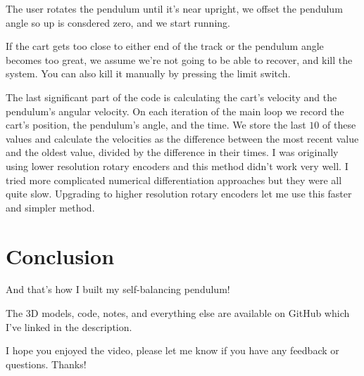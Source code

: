 \documentclass{article}
\begin{document}
The user rotates the pendulum until it's near upright, we offset the pendulum angle so up is consdered zero, and we start running.

If the cart gets too close to either end of the track or the pendulum angle becomes too great, we assume we're not going to be able to recover, and kill the system. You can also kill it manually by pressing the limit switch.

The last significant part of the code is calculating the cart's velocity and the pendulum's angular velocity. On each iteration of the main loop we record the cart's position, the pendulum's angle, and the time. We store the last $10$ of these values and calculate the velocities as the difference between the most recent value and the oldest value, divided by the difference in their times. I was originally using lower resolution rotary encoders and this method didn't work very well. I tried more complicated numerical differentiation approaches but they were all quite slow. Upgrading to higher resolution rotary encoders let me use this faster and simpler method.

\section{Conclusion}

And that's how I built my self-balancing pendulum!

The 3D models, code, notes, and everything else are available on GitHub which I've linked in the description.

I hope you enjoyed the video, please let me know if you have any feedback or questions. Thanks!
\end{document}
